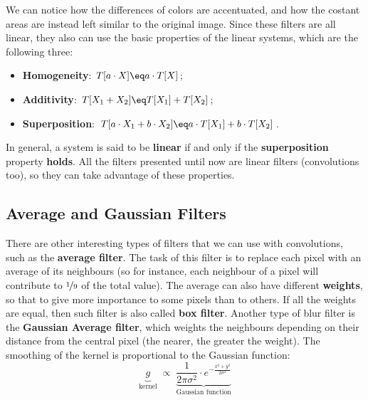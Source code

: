 \begin{center}
\end{center}

We can notice how the differences of colors are accentuated, and how the costant areas are instead left similar to the original image.
\nl
Since these filters are all linear, they also can use the basic properties of the linear systems, which are the following three:
\begin{itemize}
    \item \textbf{Homogeneity}: $T[a \cdot X] \eq a \cdot T[X]$;
    \item \textbf{Additivity}: $T[X_1 + X_2] \eq T[X_1] + T[X_2]$;
    \item \textbf{Superposition}: $T[a \cdot X_1 + b \cdot X_2] \eq a \cdot T[X_1] + b \cdot T[X_2]$.
\end{itemize}

In general, a system is said to be \textbf{linear} if and only if the \textbf{superposition} property \textbf{holds}. All the filters presented until now are linear filters (convolutions too), so they can take advantage of these properties.

\subsection{Average and Gaussian Filters}

There are other interesting types of filters that we can use with convolutions, such as the \textbf{average filter}. The task of this filter is to replace each pixel with an average of its neighbours (so for instance, each neighbour of a pixel will contribute to $\nicefrac{1}{9}$ of the total value). The average can also have different \textbf{weights}, so that to give more importance to some pixels than to others. If all the weights are equal, then such filter is also called \textbf{box filter}.
\nl
Another type of blur filter is the \textbf{Gaussian Average filter}, which weights the neighbours depending on their distance from the central pixel (the nearer, the greater the weight). The smoothing of the kernel is proportional to the Gaussian function:
\[ \underbrace{g}_{\text{kernel}} \; \propto \; \underbrace{\frac{1}{2 \pi \sigma^2} \cdot e^{- \frac{x^2 + y^2}{2 \sigma^2}}}_{\text{Gaussian function}} \]

